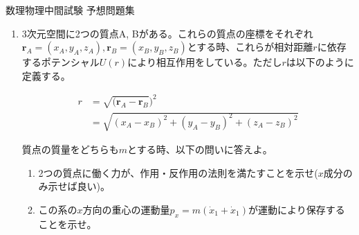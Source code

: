 \documentclass{jsarticle}
\begin{document}
\begin{center}
    {\huge 数理物理中間試験 予想問題集}\\
\end{center}

\begin{enumerate}
    \item 3次元空間に2つの質点A, Bがある。これらの質点の座標をそれぞれ$\bm{r}_A = (x_A,y_A,z_A), \bm{r}_B = (x_B,y_B,z_B)$とする時、これらが相対距離$r$に依存するポテンシャル$U(r)$により相互作用をしている。ただし$r$は以下のように定義する。

          $$
              \begin{aligned}
                  r & = \sqrt{(\boldsymbol{r}_A -\boldsymbol{r}_B})^2 \\
                    & = \sqrt{(x_A-x_B)^2+(y_A-y_B)^2+(z_A-z_B)^2}
              \end{aligned}
          $$

          質点の質量をどちらも$m$とする時、以下の問いに答えよ。

          \begin{enumerate}
              \item 2つの質点に働く力が、作用・反作用の法則を満たすことを示せ($x$成分のみ示せば良い)。
              \item この系の$x$方向の重心の運動量$p_x = m(\dot{x}_1 + \dot{x}_1)$が運動により保存することを示せ。

          \end{enumerate}


\end{enumerate}
\end{document}
